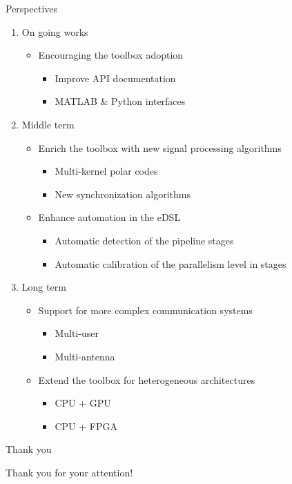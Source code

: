 \begin{frame}{Perspectives}
  \begin{enumerate}
    \item On going works
    \begin{itemize}
      \item Encouraging the toolbox adoption
      \begin{itemize}
        \item Improve API documentation
        \item MATLAB \& Python interfaces
      \end{itemize}
    \end{itemize}
    \vspace{0.1cm}
    \pause
    \item Middle term
    \begin{itemize}
      \item Enrich the toolbox with new signal processing algorithms
      \begin{itemize}
        \item Multi-kernel polar codes
        \item New synchronization algorithms
      \end{itemize}
      \item Enhance automation in the eDSL
      \begin{itemize}
        \item Automatic detection of the pipeline stages
        \item Automatic calibration of the parallelism level in stages
      \end{itemize}
    \end{itemize}
    \vspace{0.1cm}
    \pause
    \item Long term
    \begin{itemize}
      \item Support for more complex communication systems
      \begin{itemize}
        \item Multi-user
        \item Multi-antenna
      \end{itemize}
      \item Extend the toolbox for heterogeneous architectures
      \begin{itemize}
        \item CPU + GPU
        \item CPU + FPGA
      \end{itemize}
    \end{itemize}
  \end{enumerate}
\end{frame}

\begin{frame}[c]{Thank you}
  \begin{center}
  {\Large Thank you for your attention!}
  \end{center}
\end{frame}